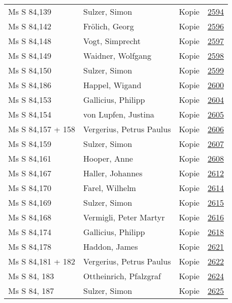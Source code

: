 \documentclass[10pt,a4paper,landscape]{report}
\begin{document}
\begin{longtable}{p{16cm}p{4cm}lr}
Ms S 84,139	&	Sulzer, Simon	&	Kopie	&	\href{http://130.60.24.72/assignment/2594}{2594}\\
Ms S 84,142	&	Frölich, Georg	&	Kopie	&	\href{http://130.60.24.72/assignment/2596}{2596}\\
Ms S 84,148	&	Vogt, Simprecht	&	Kopie	&	\href{http://130.60.24.72/assignment/2597}{2597}\\
Ms S 84,149	&	Waidner, Wolfgang	&	Kopie	&	\href{http://130.60.24.72/assignment/2598}{2598}\\
Ms S 84,150	&	Sulzer, Simon	&	Kopie	&	\href{http://130.60.24.72/assignment/2599}{2599}\\
Ms S 84,186	&	Happel, Wigand	&	Kopie	&	\href{http://130.60.24.72/assignment/2600}{2600}\\
Ms S 84,153	&	Gallicius, Philipp	&	Kopie	&	\href{http://130.60.24.72/assignment/2604}{2604}\\
Ms S 84,154	&	von Lupfen, Justina	&	Kopie	&	\href{http://130.60.24.72/assignment/2605}{2605}\\
Ms S 84,157 + 158	&	Vergerius, Petrus Paulus	&	Kopie	&	\href{http://130.60.24.72/assignment/2606}{2606}\\
Ms S 84,159	&	Sulzer, Simon	&	Kopie	&	\href{http://130.60.24.72/assignment/2607}{2607}\\
Ms S 84,161	&	Hooper, Anne	&	Kopie	&	\href{http://130.60.24.72/assignment/2608}{2608}\\
Ms S 84,167	&	Haller, Johannes	&	Kopie	&	\href{http://130.60.24.72/assignment/2612}{2612}\\
Ms S 84,170	&	Farel, Wilhelm	&	Kopie	&	\href{http://130.60.24.72/assignment/2614}{2614}\\
Ms S 84,169	&	Sulzer, Simon	&	Kopie	&	\href{http://130.60.24.72/assignment/2615}{2615}\\
Ms S 84,168	&	Vermigli, Peter Martyr	&	Kopie	&	\href{http://130.60.24.72/assignment/2616}{2616}\\
Ms S 84,174	&	Gallicius, Philipp	&	Kopie	&	\href{http://130.60.24.72/assignment/2618}{2618}\\
Ms S 84,178	&	Haddon, James	&	Kopie	&	\href{http://130.60.24.72/assignment/2621}{2621}\\
Ms S 84,181 + 182	&	Vergerius, Petrus Paulus	&	Kopie	&	\href{http://130.60.24.72/assignment/2622}{2622}\\
Ms S 84, 183	&	Ottheinrich, Pfalzgraf	&	Kopie	&	\href{http://130.60.24.72/assignment/2624}{2624}\\
Ms S 84, 187	&	Sulzer, Simon	&	Kopie	&	\href{http://130.60.24.72/assignment/2625}{2625}\\

\end{longtable}
\end{document}
